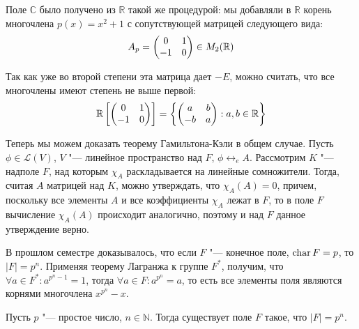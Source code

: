 \begin{note}
	Поле $\mathbb{C}$ было получено из $\mathbb{R}$ такой же процедурой: мы добавляли в $\mathbb{R}$ корень многочлена $p(x) = x^2 + 1$ с сопутствующей матрицей следующего вида:
	\[A_p = \begin{pmatrix}0&1\\-1&0\end{pmatrix} \in M_2(\mathbb{R})\]
	
	Так как уже во второй степени эта матрица дает $-E$, можно считать, что все многочлены имеют степень не выше первой:
	\[\mathbb{R}\left[\begin{pmatrix}0&1\\-1&0\end{pmatrix}\right] = \left\{\begin{pmatrix}a&b\\-b&a\end{pmatrix} : a, b \in \mathbb{R}\right\}\]
\end{note}

\begin{note}
	Теперь мы можем доказать теорему Гамильтона-Кэли в общем случае. Пусть $\phi \in \mathcal{L}(V)$, $V$ "--- линейное пространство над $F$, $\phi \leftrightarrow_e A$. Рассмотрим $K$ "--- надполе $F$, над которым $\chi_A$ раскладывается на линейные сомножители. Тогда, считая $A$ матрицей над $K$, можно утверждать, что $\chi_A(A) = 0$, причем, поскольку все элементы $A$ и все коэффициенты $\chi_A$ лежат в $F$, то в поле $F$ вычисление $\chi_A(A)$ происходит аналогично, поэтому и над $F$ данное утверждение верно.
\end{note}

\begin{note}
	В прошлом семестре доказывалось, что если $F$ "--- конечное поле, $\operatorname{char}{F} = p$, то $|F| = p^n$. Применяя теорему Лагранжа к группе $F^*$, получим, что $\forall a \in F^*: a^{p^n - 1} = 1$, тогда $\forall a \in F: a^{p^n} = a$, то есть все элементы поля являются корнями многочлена $x^{p^n} - x$.
\end{note}

\begin{theorem}
	Пусть $p$ "--- простое число, $n \in \mathbb{N}$. Тогда существует поле $F$ такое, что $|F| = p^n$.
\end{theorem}


